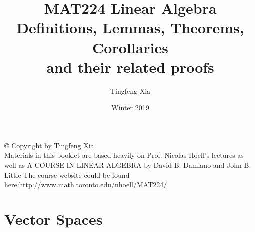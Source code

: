 \documentclass[12pt]{book}
\title{%
  \textbf{MAT224 Linear Algebra}\\
  \large Definitions, Lemmas, Theorems, Corollaries \\
    and their related proofs}
\author{Tingfeng Xia}
\date{Winter 2019}
\begin{document}
\maketitle
\newpage %
\mbox{}
\vfill
© Copyright by Tingfeng Xia \\

Materials in this booklet are based heavily on Prof. Nicolas Hoell's lectures as well as A COURSE IN LINEAR ALGEBRA by David B. Damiano and John B. Little\newline\newline
The course website could be found here:\newline \url{http://www.math.toronto.edu/nhoell/MAT224/}
\newpage
\tableofcontents

\chapter{Vector Spaces}
\end{document}
